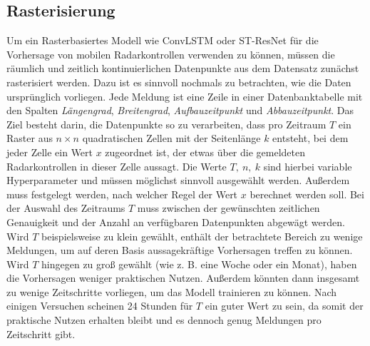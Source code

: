 \subsection{Rasterisierung}
\label{sec:Rasterisierung}
Um ein Rasterbasiertes Modell wie ConvLSTM oder ST-ResNet für die Vorhersage von mobilen Radarkontrollen verwenden zu können, müssen die räumlich und zeitlich kontinuierlichen Datenpunkte aus dem Datensatz zunächst rasterisiert werden.
Dazu ist es sinnvoll nochmals zu betrachten, wie die Daten ursprünglich vorliegen.
Jede Meldung ist eine Zeile in einer Datenbanktabelle mit den Spalten \emph{Längengrad}, \emph{Breitengrad}, \emph{Aufbauzeitpunkt} und \emph{Abbauzeitpunkt}.
Das Ziel besteht darin, die Datenpunkte so zu verarbeiten, dass pro Zeitraum $T$ ein Raster aus $n \times n$ quadratischen Zellen mit der Seitenlänge $k$ entsteht, bei dem jeder Zelle ein Wert $x$ zugeordnet ist, der etwas über die gemeldeten Radarkontrollen in dieser Zelle aussagt.
Die Werte $T,~n,~k$ sind hierbei variable Hyperparameter und müssen möglichst sinnvoll ausgewählt werden.
Außerdem muss festgelegt werden, nach welcher Regel der Wert $x$ berechnet werden soll.
Bei der Auswahl des Zeitraums $T$ muss zwischen der gewünschten zeitlichen Genauigkeit und der Anzahl an verfügbaren Datenpunkten abgewägt werden.
Wird $T$ beispielsweise zu klein gewählt, enthält der betrachtete Bereich zu wenige Meldungen, um auf deren Basis aussagekräftige Vorhersagen treffen zu können.
Wird $T$ hingegen zu groß gewählt (wie z. B. eine Woche oder ein Monat), haben die Vorhersagen weniger praktischen Nutzen.
Außerdem könnten dann insgesamt zu wenige Zeitschritte vorliegen, um das Modell trainieren zu können.
Nach einigen Versuchen scheinen 24 Stunden für $T$ ein guter Wert zu sein, da somit der praktische Nutzen erhalten bleibt und es dennoch genug Meldungen pro Zeitschritt gibt.

